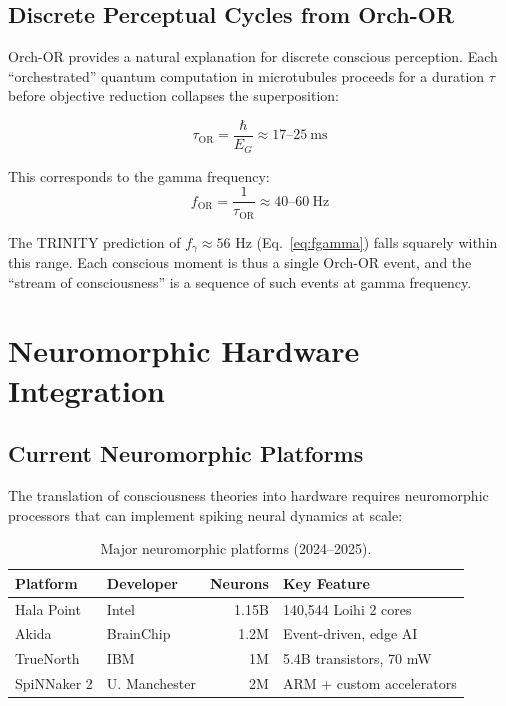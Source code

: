 \documentclass[12pt,a4paper]{article}
\begin{document}
\subsection{Discrete Perceptual Cycles from Orch-OR}

Orch-OR provides a natural explanation for discrete conscious perception. Each
``orchestrated'' quantum computation in microtubules proceeds for a duration
$\tau$ before objective reduction collapses the superposition:

\begin{equation}
\tau_{\mathrm{OR}} = \frac{\hbar}{E_G} \approx 17\text{--}25~\text{ms}
\end{equation}

\noindent
This corresponds to the gamma frequency:
\begin{equation}
f_{\mathrm{OR}} = \frac{1}{\tau_{\mathrm{OR}}} \approx 40\text{--}60~\text{Hz}
\end{equation}

\noindent
The TRINITY prediction of $f_\gamma \approx 56$ Hz (Eq.~\ref{eq:fgamma}) falls
squarely within this range. Each conscious moment is thus a single Orch-OR
event, and the ``stream of consciousness'' is a sequence of such events at
gamma frequency.

\section{Neuromorphic Hardware Integration}
\label{sec:neuromorphic}

\subsection{Current Neuromorphic Platforms}

The translation of consciousness theories into hardware requires neuromorphic
processors that can implement spiking neural dynamics at scale:

\begin{table}[h!]
\centering
\caption{Major neuromorphic platforms (2024--2025).}
\label{tab:neuromorphic}
\begin{tabular}{@{}llrl@{}}
\toprule
\textbf{Platform} & \textbf{Developer} & \textbf{Neurons} & \textbf{Key Feature} \\
\midrule
Hala Point & Intel & 1.15B & 140,544 Loihi 2 cores \\
Akida & BrainChip & 1.2M & Event-driven, edge AI \\
TrueNorth & IBM & 1M & 5.4B transistors, 70 mW \\
SpiNNaker 2 & U. Manchester & 2M & ARM + custom accelerators \\
\bottomrule
\end{tabular}
\end{table}
\end{document}
